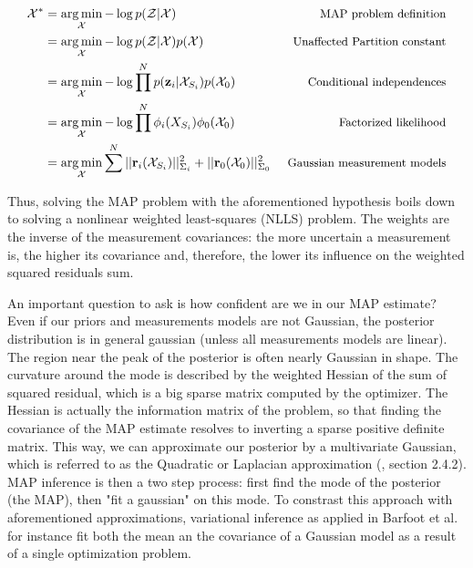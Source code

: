 \begin{align}
    \mathcal{X}^* 
    &= \operatorname*{arg\,min}_{\mathcal{X}} - \log p(\mathcal{Z} | \mathcal{X}) ~&\mbox{\small MAP problem definition}\\
    &= \operatorname*{arg\,min}_{\mathcal{X}} - \log p(\mathcal{Z} | \mathcal{X}) p(\mathcal{X}) ~&\mbox{\small Unaffected Partition constant}\\
    &= \operatorname*{arg\,min}_{\mathcal{X}} - \log \prod^{N} p({\bf z}_i | \mathcal{X}_{S_i}) p(\mathcal{X}_0) ~&\mbox{\small Conditional independences}\\
    &= \operatorname*{arg\,min}_{\mathcal{X}} - \log \prod^{N} \phi_i(X_{S_i}) \phi_0(\mathcal{X}_{0}) ~&\mbox{\small Factorized likelihood}\\
    &= \operatorname*{arg\,min}_{\mathcal{X}} \sum^{N} ||{\bf r}_i(\mathcal{X}_{S_i})||_{\Sigma_i}^2 + ||{\bf r}_0(\mathcal{X}_{0})||_{\Sigma_0}^2 ~&\mbox{\small Gaussian measurement models}\\
\end{align}

Thus, solving the MAP problem with the aforementioned hypothesis boils down to solving a nonlinear weighted least-squares (NLLS) problem.
The weights are the inverse of the measurement covariances: the more uncertain a measurement is, the higher its covariance and, therefore, the lower its influence
on the weighted squared residuals sum. 

An important question to ask is how confident are we in our MAP estimate? Even if our priors and measurements models are not Gaussian, the posterior distribution
is in general gaussian (unless all measurements models are linear). The region near the peak of the posterior is often nearly Gaussian in shape.
The curvature around the mode is described by the weighted Hessian of the sum of squared residual, which is a big sparse matrix computed by the optimizer.
The Hessian is actually the information matrix of the problem, so that finding the covariance of the MAP estimate resolves to inverting a sparse positive definite 
matrix. This way, we can approximate our posterior by a multivariate Gaussian, which is referred to as the Quadratic or Laplacian approximation 
(\cite{mcelreath2018statistical}, section 2.4.2). MAP inference is then a two step process: first find the mode of the posterior (the MAP), then "fit
 a gaussian" on this mode. To constrast this approach with aforementioned approximations, variational inference as applied in Barfoot et al. 
 \cite{barfoot2020exactly} for instance fit both the mean an the covariance of a Gaussian model as a result of a single optimization problem.

